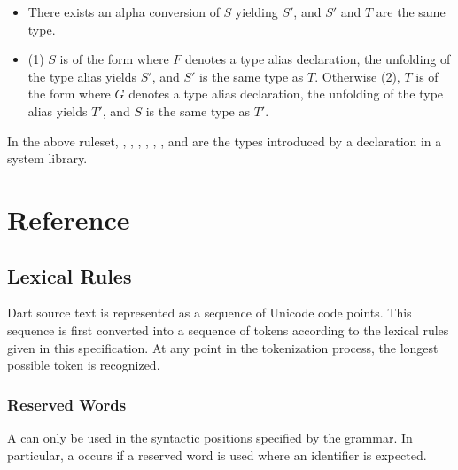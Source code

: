 \documentclass[makeidx]{article}
\begin{document}
{\begin{itemize}
\item There exists an alpha conversion of $S$ yielding $S'$, and
  $S'$ and $T$ are the same type.
\item (1) $S$ is of the form  where $F$
  denotes a type alias declaration,
  the unfolding of the type alias yields $S'$,
  and $S'$ is the same type as $T$.
  Otherwise (2), $T$ is of the form  where $G$
  denotes a type alias declaration,
  the unfolding of the type alias yields $T'$,
  and $S$ is the same type as $T'$.
\end{itemize}

\LMHash{}%
In the above ruleset, , , ,
, ,
, and 
are the types introduced by a declaration in a system library.


\section{Reference}


\subsection{Lexical Rules}

\LMHash{}%
Dart source text is represented as a sequence of Unicode code points.
This sequence is first converted into a sequence of tokens
according to the lexical rules given in this specification.
At any point in the tokenization process,
the longest possible token is recognized.


\subsubsection{Reserved Words}

\LMHash{}%
A  can only be used in the syntactic positions
specified by the grammar.
In particular, a  occurs if a reserved word is used
where an identifier is expected.


}
\end{document}

